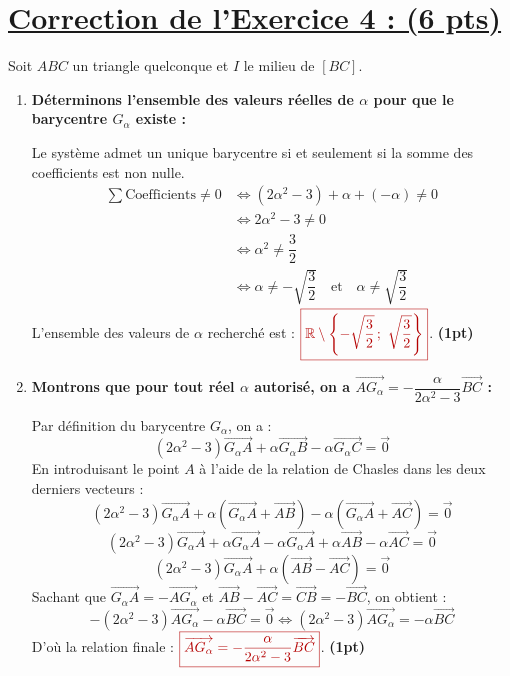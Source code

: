 \documentclass[12pt,a4paper]{article}
\newcommand{\redtitle}[1]{\textcolor{myred}{\textbf{#1}}}
\newcommand{\redbox}[1]{\color{myred}\boxed{#1}\color{black}}
\begin{document}
\section*{\underline{\redtitle{Correction de l'Exercice 4 : (6 pts)}}}

Soit $ABC$ un triangle quelconque et $I$ le milieu de $[BC]$.

\begin{enumerate}
    \item \redtitle{Déterminons l'ensemble des valeurs réelles de $\alpha$ pour que le barycentre $G_\alpha$ existe :}
    
    Le système admet un unique barycentre si et seulement si la somme des coefficients est non nulle.
    \begin{align*}
        \sum \text{Coefficients} \neq 0 &\iff (2\alpha^2 - 3) + \alpha + (-\alpha) \neq 0 \\
        & \iff 2\alpha^2 - 3 \neq 0 \\
        & \iff \alpha^2 \neq \dfrac{3}{2} \\
        & \iff \alpha \neq -\sqrt{\dfrac{3}{2}} \quad \text{et} \quad \alpha \neq \sqrt{\dfrac{3}{2}}
    \end{align*}
    L'ensemble des valeurs de $\alpha$ recherché est : $\redbox{\mathbb{R} \setminus \left\{ -\sqrt{\dfrac{3}{2}} \,;~ \sqrt{\dfrac{3}{2}} \right\}}$. \hfill \textbf{(1pt)}
    
    \item \redtitle{Montrons que pour tout réel $\alpha$ autorisé, on a $\overrightarrow{AG_\alpha} = -\dfrac{\alpha}{2\alpha^2 - 3}\overrightarrow{BC}$ :}
    
    Par définition du barycentre $G_\alpha$, on a :
    \[ (2\alpha^2 - 3)\overrightarrow{G_\alpha A} + \alpha\overrightarrow{G_\alpha B} - \alpha\overrightarrow{G_\alpha C} = \overrightarrow{0} \]
    En introduisant le point $A$ à l'aide de la relation de Chasles dans les deux derniers vecteurs :
    \[ (2\alpha^2 - 3)\overrightarrow{G_\alpha A} + \alpha\left(\overrightarrow{G_\alpha A} + \overrightarrow{AB}\right) - \alpha\left(\overrightarrow{G_\alpha A} + \overrightarrow{AC}\right) = \overrightarrow{0} \]
    \[ (2\alpha^2 - 3)\overrightarrow{G_\alpha A} + \alpha\overrightarrow{G_\alpha A} - \alpha\overrightarrow{G_\alpha A} + \alpha\overrightarrow{AB} - \alpha\overrightarrow{AC} = \overrightarrow{0} \]
    \[ (2\alpha^2 - 3)\overrightarrow{G_\alpha A} + \alpha\left(\overrightarrow{AB} - \overrightarrow{AC}\right) = \overrightarrow{0} \]
    Sachant que $\overrightarrow{G_\alpha A} = -\overrightarrow{AG_\alpha}$ et $\overrightarrow{AB} - \overrightarrow{AC} = \overrightarrow{CB} = -\overrightarrow{BC}$, on obtient :
    \[ -(2\alpha^2 - 3)\overrightarrow{AG_\alpha} - \alpha\overrightarrow{BC} = \overrightarrow{0} \iff (2\alpha^2 - 3)\overrightarrow{AG_\alpha} = -\alpha\overrightarrow{BC} \]
    D'où la relation finale : $\redbox{\overrightarrow{AG_\alpha} = -\dfrac{\alpha}{2\alpha^2 - 3}\overrightarrow{BC}}$. \hfill \textbf{(1pt)}


\end{enumerate}
\end{document}
